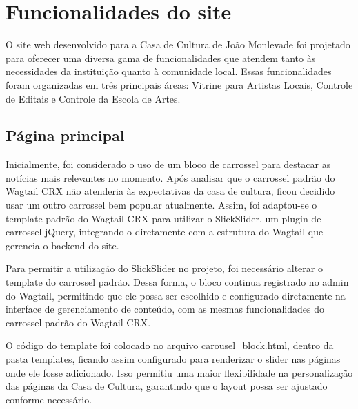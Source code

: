 \section{Funcionalidades do site}

O site web desenvolvido para a Casa de Cultura de João Monlevade foi projetado para oferecer uma diversa gama de funcionalidades que atendem tanto às necessidades da instituição quanto à comunidade local. Essas funcionalidades foram organizadas em três principais áreas: Vitrine para Artistas Locais, Controle de Editais e Controle da Escola de Artes.

\subsection{Página principal}

Inicialmente, foi considerado o uso de um bloco de carrossel para destacar as notícias mais relevantes no momento. Após analisar que o carrossel padrão do Wagtail CRX não atenderia às expectativas da casa de cultura, ficou decidido usar um outro carrossel bem popular atualmente. Assim, foi adaptou-se o template padrão do Wagtail CRX para utilizar o SlickSlider, um plugin de carrossel jQuery, integrando-o diretamente com a estrutura do Wagtail que gerencia o backend do site.

Para permitir a utilização do SlickSlider no projeto, foi necessário alterar o template do carrossel padrão. Dessa forma, o bloco continua registrado no admin do Wagtail, permitindo que ele possa ser escolhido e configurado diretamente na interface de gerenciamento de conteúdo, com as mesmas funcionalidades do carrossel padrão do Wagtail CRX.

O código do template foi colocado no arquivo carousel\_block.html, dentro da pasta templates, ficando assim configurado para renderizar o slider nas páginas onde ele fosse adicionado. Isso permitiu uma maior flexibilidade na personalização das páginas da Casa de Cultura, garantindo que o layout possa ser ajustado conforme necessário.

